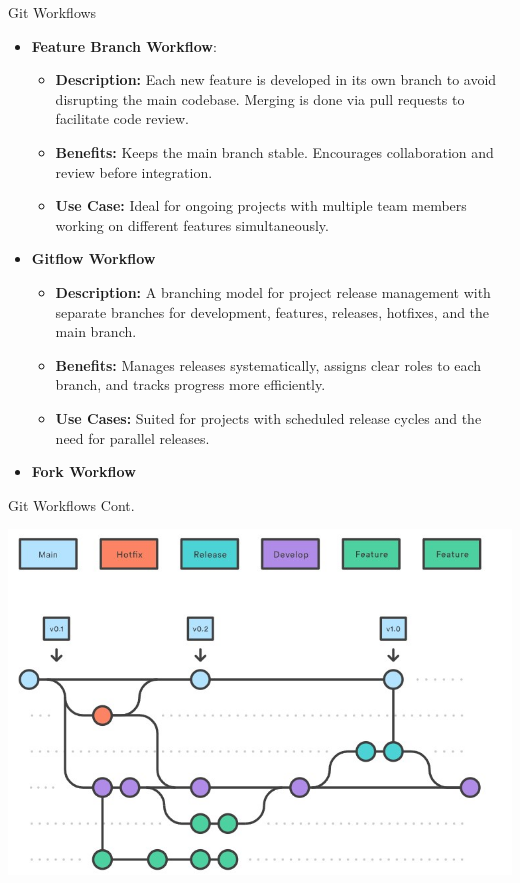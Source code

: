 \documentclass[aspectratio=169]{beamer}
\begin{document}
\begin{frame}{Git Workflows}
\begin{itemize}
    \item \textbf{Feature Branch Workflow}:
    \begin{itemize}
        \item \textbf{Description:} Each new feature is developed in its own branch to avoid disrupting the main codebase. Merging is done via pull requests to facilitate code review.
        \item \textbf{Benefits:} Keeps the main branch stable. Encourages collaboration and review before integration.
        \item \textbf{Use Case:} Ideal for ongoing projects with multiple team members working on different features simultaneously.
    \end{itemize}
    \item \textbf{Gitflow Workflow}
    \begin{itemize}
        \item \textbf{Description:} A branching model for project release management with separate branches for development, features, releases, hotfixes, and the main branch.
        \item \textbf{Benefits:} Manages releases systematically, assigns clear roles to each branch, and tracks progress more efficiently.
        \item \textbf{Use Cases:} Suited for projects with scheduled release cycles and the need for parallel releases.
    \end{itemize}
    \item \textbf{Fork Workflow}
\end{itemize}
\end{frame}
\begin{frame}{Git Workflows Cont.}
\begin{center}
    \includegraphics[scale=.6]{gitflow_workflow.jpg}
\end{center}
\end{frame}
\end{document}
